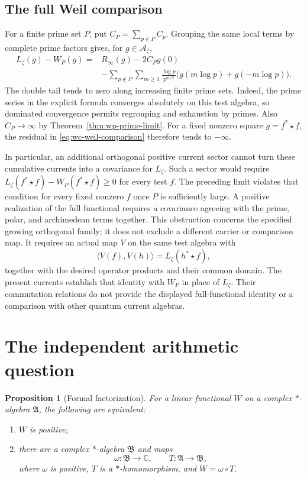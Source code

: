 \documentclass[11pt]{article}
\newtheorem{proposition}[theorem]{Proposition}
\theoremstyle{definition}
\theoremstyle{remark}
\numberwithin{equation}{section}
\newcommand{\cA}{\mathcal A}
\newcommand{\C}{\mathbb C}
\begin{document}
\subsection{The full Weil comparison}

For a finite prime set $P$, put $C_P=\sum_{p\in P}C_p$.
Grouping the same local terms by complete prime factors gives, for
$g\in\cA_\zeta$,
\begin{equation}
 \begin{split}
 L_\zeta(g)-W_P(g)
 ={}&R_\infty(g)-2C_Pg(0)\\
 &-\sum_{p\notin P}\sum_{m\geq1}
 \frac{\log p}{p^{m/2}}
 \bigl(g(m\log p)+g(-m\log p)\bigr).
 \end{split}
 \label{eq:wc-weil-comparison}
\end{equation}
The double tail tends to zero along increasing finite prime sets.
Indeed, the prime series in the explicit formula converges absolutely on this test algebra,
so dominated convergence permits regrouping and exhaustion by primes.
Also $C_P\to\infty$ by Theorem~\ref{thm:wp-prime-limit}.
For a fixed nonzero square $g=f^*\star f$, the residual in
\eqref{eq:wc-weil-comparison} therefore tends to $-\infty$.

In particular, an additional orthogonal positive current sector cannot
turn these cumulative currents into a covariance for $L_\zeta$.
Such a sector would require
$L_\zeta(f^*\star f)-W_P(f^*\star f)\geq0$ for every test $f$.
The preceding limit violates that condition for every fixed nonzero
$f$ once $P$ is sufficiently large.
A positive realization of the full functional requires a covariance
agreeing with the prime, polar, and archimedean terms together.
This obstruction concerns the specified growing orthogonal family;
it does not exclude a different carrier or comparison map.
It requires an actual map $V$ on the same test algebra with
\[
 \langle V(f),V(h)\rangle=L_\zeta(h^*\star f),
\]
together with the desired operator products and their common domain.
The present currents establish that identity with $W_P$ in place of
$L_\zeta$.  Their commutation relations do not provide the displayed
full-functional identity or a comparison with other quantum current algebras.


\section{The independent arithmetic question}

\begin{proposition}[Formal factorization]
For a linear functional $W$ on a complex $*$-algebra $\mathfrak A$, the
following are equivalent:
\begin{enumerate}
\item $W$ is positive;
\item there are a complex $*$-algebra $\mathfrak B$ and maps
\[
 \omega:\mathfrak B\longrightarrow\C,
 \qquad T:\mathfrak A\longrightarrow\mathfrak B,
\]
where $\omega$ is positive, $T$ is a $*$-homomorphism, and
$W=\omega\circ T$.
\end{enumerate}
\end{proposition}
\end{document}
